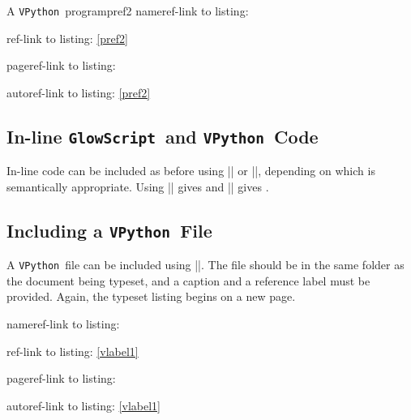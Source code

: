 \documentclass{article}
\newcommand*{\GlowScript}{\texttt{GlowScript}}
\newcommand*{\VPython}{\texttt{VPython}}
\begin{document}
\begin{glowscriptblock}{A \VPython\ program}{pref2}
nameref-link to listing: 

ref-link to listing: \ref{pref2}

pageref-link to listing: \pageref{pref2}

autoref-link to listing: \autoref{pref2}

\subsection{In-line \GlowScript\ and \VPython\ Code}
In-line code can be included as before using || or 
||, depending on which is semantically appropriate. Using \newline
|| gives \newline
{} and \newline
|| gives \newline
{}.

\subsection{Including a \VPython\ File}
A \VPython\ file can be included using ||. The file 
should be in the same folder as the document being typeset, and a caption and a reference 
label must be provided. Again, the typeset listing begins on a new page.


nameref-link to listing: 

ref-link to listing: \ref{vlabel1}

pageref-link to listing: \pageref{vlabel1}

autoref-link to listing: \autoref{vlabel1}


\end{glowscriptblock}
\end{document}
